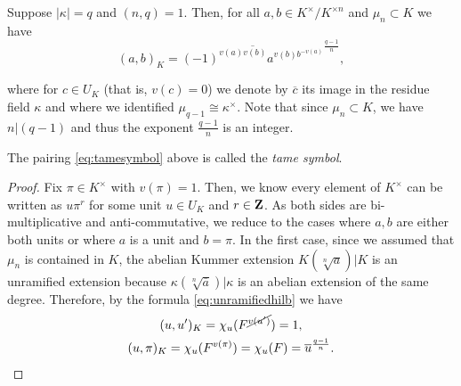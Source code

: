 \documentclass{article}
\begin{document}
\begin{prop}
		Suppose $|\kappa|=q$ and $(n,q)=1$. Then, for all $a,b\in K^\times/K^{\times n}$ and $\mu_n\subset K$ we have
		\begin{equation}\label{eq:tamesymbol}
			(a,b)_K = \overline{(-1)^{v(a)v(b)}a^{v(b)b^{-v(a)}}}^{\frac{q-1}{n}},	
		\end{equation}
			
		where for $c\in U_K$ (that is, $v(c)=0$) we denote by $\overline{c}$ its image in the residue field $\kappa$ and where we identified $\mu_{q-1}\cong \kappa^\times$. Note that since $\mu_n\subset K$, we have $n|(q-1)$ and thus the exponent $\frac{q-1}{n}$ is an integer.
\end{prop}
\begin{rmk}
		The pairing \eqref{eq:tamesymbol} above is called the \emph{tame symbol}.
\end{rmk}
\begin{proof}
		Fix $\pi\in K^\times$ with $v(\pi)=1$. Then, we know every element of $K^\times$ can be written as $u\pi^r$ for some unit $u\in U_K$ and $r\in \mathbf{Z}$. As both sides are bi-multiplicative and anti-commutative, we reduce to the cases where $a,b$ are either both units or where $a$ is a unit and $b=\pi$. In the first case, since we assumed that $\mu_n$ is contained in $K$, the abelian Kummer extension $K(\sqrt[n]{a})|K$ is an unramified extension because $\kappa(\sqrt[n]{\overline{a}})|\kappa$ is an abelian extension of the same degree. Therefore, by the formula \eqref{eq:unramifiedhilb} we have 
		\begin{gather*}
				(u,u^\prime)_K=\chi_u(F^{\cancel{v(u^\prime)}})=1,\\
				(u,\pi)_K=\chi_u(F^{v(\pi)})=\chi_u(F)=\overline{u}^{\frac{q-1}{n}}.
		\end{gather*}
\end{proof}
\end{document}
